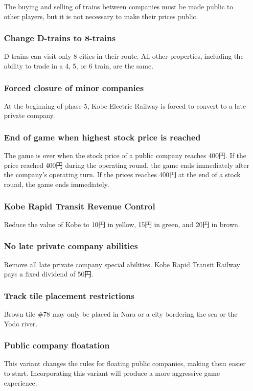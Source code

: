 \documentclass{article}
\begin{document}
\begin{CJK}{UTF8}{min}
\begin{multicols}{2}
The buying and selling of trains between companies must be made public
to other players, but it is not necessary to make their prices public.

\subsubsection{Change D-trains to 8-trains}
D-trains can visit only 8 cities in their route. All other properties,
including the ability to trade in a 4, 5, or 6 train, are the same.

\subsubsection{Forced closure of minor companies}
At the beginning of phase 5, Kobe Electric Railway is forced to
convert to a late private company.

\subsubsection{End of game when highest stock price is reached}
The game is over when the stock price of a public company reaches 400円.
If the price reached 400円 during the operating round, the game ends
immediately after the company's operating turn. If the prices reaches
400円 at the end of a stock round, the game ends immediately.

\subsubsection{Kobe Rapid Transit Revenue Control}
Reduce the value of Kobe to 10円 in yellow, 15円 in green, and 20円 in brown.

\subsubsection{No late private company abilities}
Remove all late private company special abilities. Kobe Rapid Transit
Railway pays a fixed dividend of 50円.

\subsubsection{Track tile placement restrictions}
Brown tile \#78 may only be placed in Nara or a city bordering the sea
or the Yodo river.

\subsubsection{Public company floatation}
This variant changes the rules for floating public companies, making
them easier to start. Incorporating this variant will produce a more
aggressive game experience.


\end{multicols}
\end{CJK}
\end{document}
